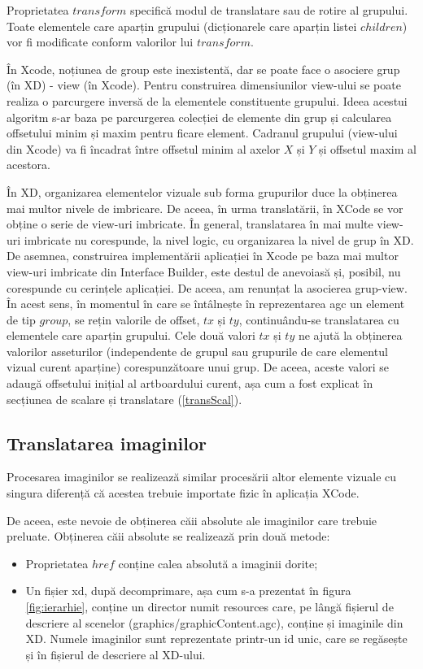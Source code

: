 Proprietatea $transform$ specifică modul de translatare sau de rotire al grupului. Toate elementele care aparțin grupului (dicționarele care aparțin listei $children$) vor fi modificate conform valorilor lui $transform$.

În Xcode, noțiunea de group este inexistentă, dar se poate face o asociere grup (în XD) - view (în Xcode).  
Pentru construirea dimensiunilor view-ului se poate realiza o parcurgere inversă de la elementele constituente grupului. Ideea acestui algoritm s-ar baza pe parcurgerea colecției de elemente din grup și calcularea offsetului minim și maxim pentru ficare element. Cadranul grupului (view-ului din Xcode) va fi încadrat între offsetul minim al axelor $X$ și $Y$ și offsetul maxim al acestora.

În XD, organizarea elementelor vizuale sub forma grupurilor duce la obținerea mai multor nivele de imbricare. De aceea, în urma translatării, în XCode se vor obține o serie de view-uri imbricate. În general, translatarea în mai multe view-uri imbricate nu corespunde, la nivel logic, cu organizarea la nivel de grup în XD. De asemnea, construirea implementării aplicației în Xcode pe baza mai multor view-uri imbricate din Interface Builder, este destul de anevoiasă și, posibil, nu corespunde cu cerințele aplicației. De aceea, am renunțat la asocierea grup-view. În acest sens, în momentul în care se întâlnește în reprezentarea agc un element de tip $group$, se rețin valorile de offset, $tx$ și $ty$, continuându-se translatarea cu elementele care aparțin grupului.  Cele două valori $tx$ și $ty$ ne ajută la obținerea valorilor asseturilor (independente de grupul sau grupurile de care elementul vizual curent aparține) corespunzătoare unui grup. De aceea, aceste valori se adaugă offsetului inițial al artboardului curent, așa cum a fost explicat în secțiunea de scalare și translatare (\ref{transScal}).

\subsection{Translatarea imaginilor}

Procesarea imaginilor se realizează similar procesării altor elemente vizuale cu singura diferență că acestea trebuie importate fizic în aplicația XCode.

De aceea, este nevoie de obținerea căii absolute ale imaginilor care trebuie preluate. 
Obținerea căii absolute se realizează prin două metode:

\begin{itemize}  
\item Proprietatea $href$ conține calea absolută a imaginii dorite;
\item Un fișier xd, după decomprimare, așa cum s-a prezentat în figura \ref{fig:ierarhie}, conține un director numit resources care, pe lângă fișierul de descriere al scenelor (graphics/graphicContent.agc), conține și imaginile din XD. Numele imaginilor sunt reprezentate printr-un id unic, care se regăsește și în fișierul de descriere al XD-ului.
\end{itemize}

